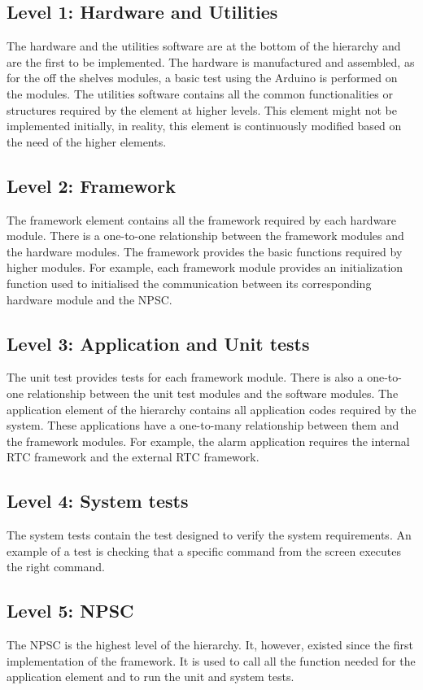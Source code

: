 \subsection{Level 1: Hardware and Utilities}  
The hardware and the utilities software are at the bottom of the hierarchy and are the first to be implemented. The hardware is manufactured and assembled, as for the off the shelves modules, a basic test using the Arduino is performed on the modules. The utilities software contains all the common functionalities or structures required by the element at higher levels. This element might not be implemented initially, in reality, this element is continuously modified based on the need of the higher elements.
\subsection{Level 2: Framework}   
The framework element contains all the framework required by each hardware module. There is a one-to-one relationship between the framework modules and the hardware modules. The framework provides the basic functions required by higher modules. For example, each framework module provides an initialization function used to initialised the communication between its corresponding hardware module and the NPSC. 
\subsection{Level 3: Application and Unit tests}   
The unit test provides tests for each framework module. There is also a  one-to-one relationship between the unit test modules and the software modules. The application element of the hierarchy contains all application codes required by the system. These applications have a one-to-many relationship between them and the framework modules. For example, the alarm application requires the internal RTC framework and the external RTC framework. 
\subsection{Level 4: System tests}   
The system tests contain the test designed to verify the system requirements. An example of a test is checking that a specific command from the screen executes the right command.
\subsection{Level 5: NPSC}   
The NPSC is the highest level of the hierarchy. It, however, existed since the first implementation of the framework. It is used to call all the function needed for the application element and to run the unit and system tests.

